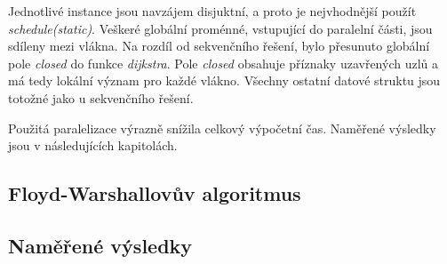 \documentclass[a4paper,11pt]{article}
\begin{document}
Jednotlivé instance jsou navzájem disjuktní, a proto je nejvhodnější použít \textit{schedule(static)}. Veškeré globální proménné, vstupující do paralelní části, jsou sdíleny mezi vlákna.
Na rozdíl od sekvenčního řešení, bylo přesunuto globální pole \textit{closed} do funkce \textit{dijkstra}. Pole \textit{closed} obsahuje příznaky uzavřených uzlů a má tedy lokální význam pro 
každé vlákno. Všechny ostatní datové struktu jsou totožné jako u sekvenčního řešení.

Použitá paralelizace výrazně snížila celkový výpočetní čas. Naměřené výsledky jsou v následujících kapitolách.

\subsection{Floyd-Warshallovův algoritmus}

\subsection{Naměřené výsledky}
\end{document}
